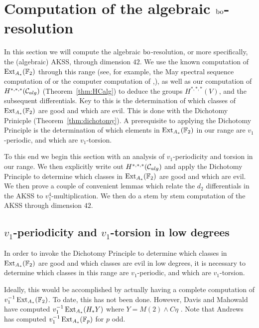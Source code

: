 
\section{Computation of the algebraic $\mathrm{bo}$-resolution}\label{sec:algcomp}


In this section we will compute the algebraic $\mathrm{bo}$-resolution, or more specifically, the (algebraic) AKSS, through dimension $42$.  We use the known computation of $\operatorname{Ext}_{A_*}(\mathbb{F}_2)$ through this range (see, for example, the May spectral sequence computation of \cite{Tangora} or the computer computation of \cite{Bruner},\cite{Brunertable}), as well as our computation of $H^{*,*,*}(\mathcal{C}_{alg})$ (Theorem~\ref{thm:HCalg}) to deduce the groups $H^{*,*,*}(V)$, and the subsequent differentials.  Key to this is the determination of which classes of $\operatorname{Ext}_{A_*}(\mathbb{F}_2)$ are good and which are evil.  This is done with the Dichotomy Prinicple (Theorem~\ref{thm:dichotomy}).  A prerequisite to applying the Dichotomy Principle is the determination of which elements in $\operatorname{Ext}_{A_*}(\mathbb{F}_2)$ in our range are $v_1$-periodic, and which are $v_1$-torsion.

To this end we begin this section with an analysis of $v_1$-periodicity and torsion in our range.  We then explicitly write out $H^{*,*,*}(\mathcal{C}_{alg})$ and apply the Dichotomy Principle to determine which classes in $\operatorname{Ext}_{A_*}(\mathbb{F}_2)$ are good and which are evil.  We then prove a couple of convenient lemmas which relate the $d_2$ differentials in the AKSS to $v_1^4$-multiplication.  We then do a  stem by stem computation of the AKSS through dimension $42$. 

\subsection*{$v_1$-periodicity and $v_1$-torsion in low degrees}

In order to invoke the Dichotomy Principle to determine which classes in $\operatorname{Ext}_{A_*}(\mathbb{F}_2)$ are good and which classes are evil in low degrees, it is necessary to determine which classes in this range are $v_1$-periodic, and which are $v_1$-torsion.

Ideally, this would be accomplished by actually having a complete computation of $v_1^{-1}\operatorname{Ext}_{A_*}(\mathbb{F}_2)$.  To date, this has not been done.  However, Davis and Mahowald have computed $v_1^{-1}\operatorname{Ext}_{A_*}(H_*Y)$ where $Y = M(2) \wedge C\eta$ \cite{DavisMahowaldv1}.  Note that Andrews \cite{Andrews} has computed $v_1^{-1}\operatorname{Ext}_{A_*}(\mathbb{F}_p)$ for $p$ odd.

